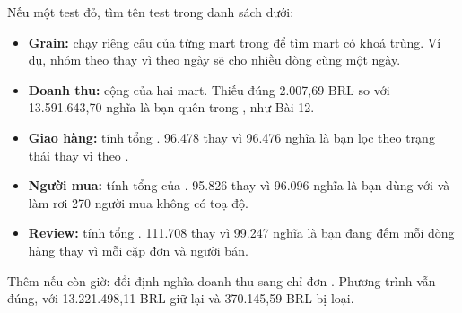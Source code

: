 Nếu một test đỏ, tìm tên test trong danh sách dưới:
\begin{itemize}
  \item \textbf{Grain:} chạy riêng câu  của từng mart trong  để tìm mart có khoá trùng. Ví dụ, nhóm theo  thay vì theo ngày sẽ cho nhiều dòng cùng một ngày.
  \item \textbf{Doanh thu:} cộng  của hai mart. Thiếu đúng 2.007,69 BRL so với 13.591.643,70 nghĩa là bạn quên  trong , như Bài 12.
  \item \textbf{Giao hàng:} tính tổng . 96.478 thay vì 96.476 nghĩa là bạn lọc theo trạng thái  thay vì theo .
  \item \textbf{Người mua:} tính tổng  của . 95.826 thay vì 96.096 nghĩa là bạn dùng  với  và làm rơi 270 người mua không có toạ độ.
  \item \textbf{Review:} tính tổng . 111.708 thay vì 99.247 nghĩa là bạn đang đếm mỗi dòng hàng thay vì mỗi cặp đơn và người bán.
\end{itemize}


Thêm nếu còn giờ: đổi định nghĩa doanh thu sang chỉ đơn . Phương trình vẫn đúng, với 13.221.498,11 BRL giữ lại và 370.145,59 BRL bị loại.

